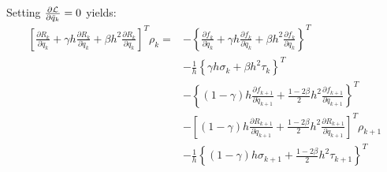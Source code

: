 \documentclass{beamer}
\newcommand{\pd}[2]{\frac{\partial #1}{\partial #2}}
\begin{document}
\begin{frame}[allowframebreaks]
{         Setting $\pd{\cal{L}}{\ddot{q}_k} = 0$ yields:
         \begin{equation}
           \begin{split}
             \left[ \pd{R_k}{\ddot{q}_k} + \gamma h \pd{R_k}{\dot{q}_k} + \beta h^2 \pd{R_k}{{q}_k} \right]^T \rho_k = &- \left\{ \pd{f_k}{\ddot{q}_k} + \gamma h \pd{f_k}{\dot{q}_k} + \beta h^2 \pd{f_k}{{q}_k} \right\}^T \\
             & -  \frac{1}{h}\left\{  \gamma h  \sigma_k + \beta h^2   \tau_k \right\}^T\\
             & -  \left\{ (1-\gamma) h \pd{f_{k+1}}{\dot{q}_{k+1}} + \frac{1-2\beta}{2} h^2 \pd{f_{k+1}}{{q}_{k+1}} \right\}^T \\
                          & -  \left[ (1-\gamma) h \pd{R_{k+1}}{\dot{q}_{k+1}} + \frac{1-2\beta}{2} h^2 \pd{R_{k+1}}{{q}_{k+1}} \right]^T\rho_{k+1} \\
             & -  \frac{1}{h} \left\{ (1-\gamma) h \sigma_{k+1} + \frac{1-2\beta}{2} h^2 \tau_{k+1} \right\}^T\\
           \end{split}
         \end{equation}

}
\end{frame}
\end{document}

